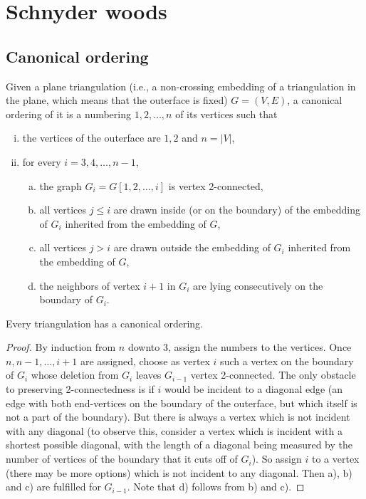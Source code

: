 \chapter{Schnyder woods}

\section{Canonical ordering}

\begin{defn}
	Given a plane triangulation (i.e., a non-crossing embedding of a triangulation in the plane, which means that the outerface is fixed) $G = (V, E)$, a canonical ordering of it is a numbering $1, 2, \dots, n$ of its vertices such that
	
	\begin{enumerate}[i)]
		\item the vertices of the outerface are $1, 2$ and $n = |V|$,
		\item for every $i = 3, 4, \dots, n - 1$,
		\begin{enumerate}[a)]
			\item the graph $G_i = G[1, 2, \dots, i]$ is vertex 2-connected,
			\item all vertices $j \leq i$ are drawn inside (or on the boundary) of the embedding of $G_i$ inherited from the embedding of $G$,
			\item all vertices $j > i$ are drawn outside the embedding of $G_i$ inherited from the embedding of $G$,
			\item the neighbors of vertex $i + 1$ in $G_i$ are lying consecutively on the boundary of $G_i$.
		\end{enumerate}
	\end{enumerate}
\end{defn}

\begin{thm}
	Every triangulation has a canonical ordering.
\end{thm}

\begin{proof}
	By induction from $n$ downto $3$, assign the numbers to the vertices. Once $n, n - 1, \dots, i + 1$ are assigned, choose as vertex $i$ such a vertex on the boundary of $G_i$ whose deletion from $G_i$ leaves $G_{i-1}$ vertex 2-connected. The only obstacle to preserving 2-connectedness is if $i$ would be incident to a diagonal edge (an edge with both end-vertices on the boundary of the outerface, but which itself is not a part of the boundary). But there is always a vertex which is not incident with any diagonal (to observe this, consider a vertex which is incident with a shortest possible diagonal, with the length of a diagonal being measured by the number of vertices of the boundary that it cuts off of $G_i$). So assign $i$ to a vertex (there may be more options) which is not incident to any diagonal. Then a), b) and c) are fulfilled for $G_{i-1}$. Note that d) follows from b) and c).
\end{proof}

